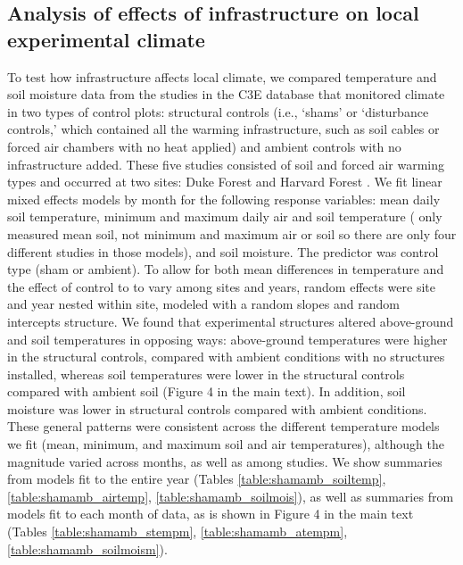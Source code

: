 \documentclass{article}
\begin{document}
\subsection* {Analysis of effects of infrastructure on local experimental climate}
To test how infrastructure affects local climate, we compared temperature and soil moisture data from the studies in the C3E database that monitored climate in two types of control plots: structural controls (i.e., `shams' or `disturbance controls,'
which contained all the warming infrastructure, such as soil cables or forced air chambers with no heat applied) and ambient controls with no infrastructure added. These five studies consisted of soil and forced air warming types and occurred at two sites: Duke Forest and Harvard Forest \citep{farnsworth1995,clark2014a,marchin2015,pelini2011}. We fit linear mixed effects models by month for the following response variables: mean daily soil temperature, minimum and maximum daily air and soil temperature (\citet{farnsworth1995} only measured mean soil, not minimum and maximum air or soil so there are only four different studies in those models), and soil moisture. The predictor was control type (sham or ambient). To allow for both mean differences in temperature and the effect of control to to vary among sites and years, random effects were site and year nested within site, modeled with a random slopes and random intercepts structure. 
We found that experimental structures altered above-ground and soil temperatures in opposing ways: above-ground temperatures were higher in the structural controls, compared with ambient conditions with no structures installed, whereas soil temperatures were lower in the structural controls compared with ambient soil (Figure 4 in the main text).  In addition, soil moisture was lower in structural controls compared with ambient conditions. These general patterns were consistent across the different temperature models we fit (mean, minimum, and maximum soil and air temperatures), although the magnitude varied across months, as well as among studies. We show summaries from models fit to the entire year (Tables \ref{table:shamamb_soiltemp}, \ref{table:shamamb_airtemp}, \ref{table:shamamb_soilmois}), as well as summaries from models fit to each month of data, as is shown in Figure 4 in the main text (Tables \ref{table:shamamb_stempm}, \ref{table:shamamb_atempm}, \ref{table:shamamb_soilmoism}).
\end{document}
